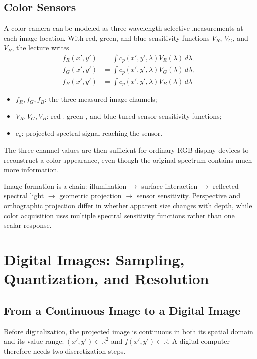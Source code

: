 \documentclass[11pt,a4paper,oneside]{report}
\newcommand{\mathlegend}[1]{%
  \par\vspace{0.2em}{\small\itshape where}\par
  \begin{itemize}[leftmargin=1.7em,topsep=0.15em,itemsep=0.12em]
  #1
  \end{itemize}
}
\begin{document}
\section{Color Sensors}

A color camera can be modeled as three wavelength-selective measurements at each image location. With red, green, and blue sensitivity functions $V_R$, $V_G$, and $V_B$, the lecture writes
\begin{align}
 f_R(x',y') &= \int c_p(x',y',\lambda)V_R(\lambda)\,d\lambda,\nonumber\\
 f_G(x',y') &= \int c_p(x',y',\lambda)V_G(\lambda)\,d\lambda,\label{eq:rgb-sensor}\\
 f_B(x',y') &= \int c_p(x',y',\lambda)V_B(\lambda)\,d\lambda.\nonumber
\end{align}
\mathlegend{
  \item $f_R,f_G,f_B$: the three measured image channels;
  \item $V_R,V_G,V_B$: red-, green-, and blue-tuned sensor sensitivity functions;
  \item $c_p$: projected spectral signal reaching the sensor.
}
The three channel values are then sufficient for ordinary RGB display devices to reconstruct a color appearance, even though the original spectrum contains much more information.

\FloatBarrier
\begin{chaptersummary}
Image formation is a chain: illumination $\rightarrow$ surface interaction $\rightarrow$ reflected spectral light $\rightarrow$ geometric projection $\rightarrow$ sensor sensitivity. Perspective and orthographic projection differ in whether apparent size changes with depth, while color acquisition uses multiple spectral sensitivity functions rather than one scalar response.
\end{chaptersummary}

\chapter{Digital Images: Sampling, Quantization, and Resolution}

\section{From a Continuous Image to a Digital Image}

Before digitalization, the projected image is continuous in both its spatial domain and its value range: $(x',y')\in\mathbb{R}^2$ and $f(x',y')\in\mathbb{R}$. A digital computer therefore needs two discretization steps.
\end{document}
